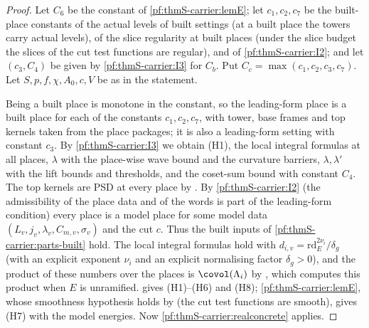 \begin{proof}
Let $C_6$ be the constant of \cref{pf:thmS-carrier:lemE}; let $c_1,c_2,c_7$ be the built-place constants of the actual levels
of built settings  (at a built place the towers carry actual
levels), of the slice regularity at built places  (under
the slice budget the slices of the cut test functions are regular), and of \ref{pf:thmS-carrier:I2}; and let $(c_3,C_4)$ be
given by \ref{pf:thmS-carrier:I3} for $C_b$. Put $C_c=\max(c_1,c_2,c_3,c_7)$. Let $S,p,f,\chi,A_0,c,V$ be as in the
statement.

Being a built place is monotone in the constant, so the leading-form place is a built place for each of the constants
$c_1,c_2,c_7$, with tower, base frames and top kernels taken from the place packages; it is also a leading-form setting with
constant $c_3$. By \ref{pf:thmS-carrier:I3} we obtain (H1), the local integral formulas at all places, $\lambda$ with the
place-wise wave bound and the curvature barriers, $\lambda,\lambda'$ with the lift bounds and thresholds, and the coset-sum
bound with constant $C_4$. The top kernels are PSD at every place by
. By \ref{pf:thmS-carrier:I2} (the admissibility of the place
data and of the words is part of the leading-form condition) every place is a model place for some model data
$(L_v,j_v,\lambda_v,C_{m,v},\sigma_v)$ and the cut $c$. Thus the built inputs of \cref{pf:thmS-carrier:parts-built} hold. The
local integral formulas hold with $d_{i,v}=\mathrm{rd}_E^{2\nu_i}/\delta_g$ (with an explicit exponent $\nu_i$ and an explicit normalising factor $\delta_g>0$), and the product of these
numbers over the places is $\covol(\Lambda_i)$ by , which computes this
product when $E$ is unramified.  gives (H1)--(H6) and (H8); \cref{pf:thmS-carrier:lemE},
whose smoothness hypothesis holds by  (the cut test functions are smooth),
gives (H7) with the model energies. Now \cref{pf:thmS-carrier:realconcrete} applies.
\end{proof}

